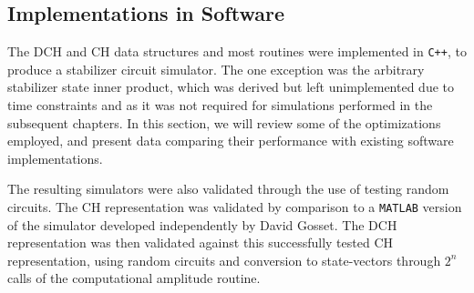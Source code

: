 \subsection{Implementations in Software}\label{sec:stabilizer_simulators}
The DCH and CH data structures and most routines were implemented in \texttt{C++}, to produce a stabilizer circuit simulator. The one exception was the arbitrary stabilizer state inner product, which was derived but left unimplemented due to time constraints and as it was not required for simulations performed in the subsequent chapters. In this section, we will review some of the optimizations employed, and present data comparing their performance with existing software implementations.\par
The resulting simulators were also validated through the use of testing random circuits. The CH representation was validated by comparison to a \texttt{MATLAB} version of the simulator developed independently by David Gosset. The DCH representation was then validated against this successfully tested CH representation, using random circuits and conversion to state-vectors through $2^{n}$ calls of the computational amplitude routine.
